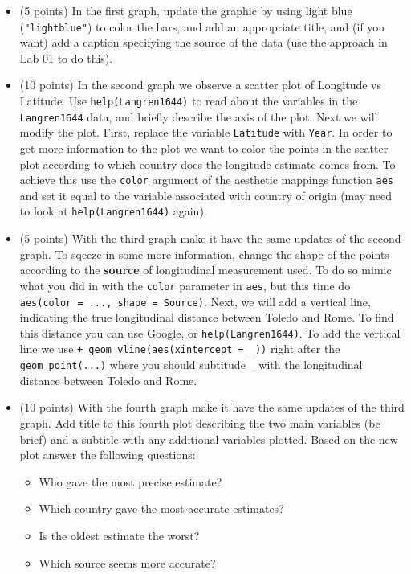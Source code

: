 \documentclass[]{article}
\providecommand{\tightlist}{%
  \setlength{\itemsep}{0pt}\setlength{\parskip}{0pt}}
\begin{document}
\begin{itemize}
\item
  (5 points) In the first graph, update the graphic by using light blue
  (\texttt{"lightblue"}) to color the bars, and add an appropriate
  title, and (if you want) add a caption specifying the source of the
  data (use the approach in Lab 01 to do this).
\item
  (10 points) In the second graph we observe a scatter plot of Longitude
  vs Latitude. Use \texttt{help(Langren1644)} to read about the
  variables in the \texttt{Langren1644} data, and briefly describe the
  axis of the plot. Next we will modify the plot. First, replace the
  variable \texttt{Latitude} with \texttt{Year}. In order to get more
  information to the plot we want to color the points in the scatter
  plot according to which country does the longitude estimate comes
  from. To achieve this use the \texttt{color} argument of the aesthetic
  mappings function \texttt{aes} and set it equal to the variable
  associated with country of origin (may need to look at
  \texttt{help(Langren1644)} again).
\item
  (5 points) With the third graph make it have the same updates of the
  second graph. To sqeeze in some more information, change the shape of
  the points according to the \textbf{source} of longitudinal
  measurement used. To do so mimic what you did in with the
  \texttt{color} parameter in \texttt{aes}, but this time do
  \texttt{aes(color\ =\ ...,\ shape\ =\ Source)}. Next, we will add a
  vertical line, indicating the true longitudinal distance between
  Toledo and Rome. To find this distance you can use Google, or
  \texttt{help(Langren1644)}. To add the vertical line we use
  \texttt{+\ geom\_vline(aes(xintercept\ =\ \_))} right after the
  \texttt{geom\_point(...)} where you should subtitude \texttt{\_} with
  the longitudinal distance between Toledo and Rome.
\item
  (10 points) With the fourth graph make it have the same updates of the
  third graph. Add title to this fourth plot describing the two main
  variables (be brief) and a subtitle with any additional variables
  plotted. Based on the new plot answer the following questions:

  \begin{itemize}
  \tightlist
  \item
    Who gave the most precise estimate?
  \item
    Which country gave the most accurate estimates?
  \item
    Is the oldest estimate the worst?
  \item
    Which source seems more accurate?
  \end{itemize}
\end{itemize}
\end{document}

